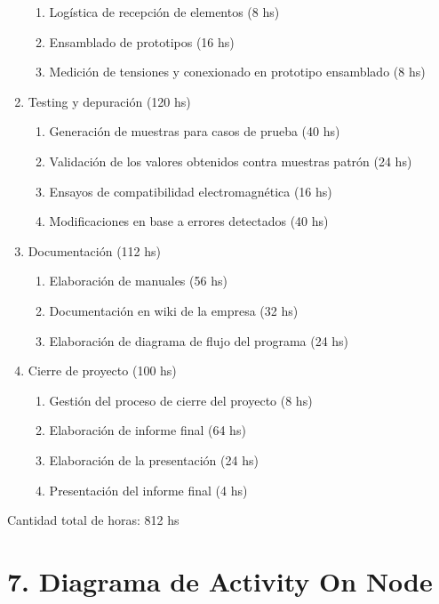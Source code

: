 \documentclass[11pt]{charter}
\begin{document}
\begin{enumerate}
\begin{enumerate}
	\item Logística de recepción de elementos (8 hs)
	\item Ensamblado de prototipos (16 hs)
	\item Medición de tensiones y conexionado en prototipo ensamblado (8 hs)
	\end{enumerate}
\item Testing y depuración (120 hs)
	\begin{enumerate}
	\item Generación de muestras para casos de prueba (40 hs)
	\item Validación de los valores obtenidos contra muestras patrón (24 hs)
	\item Ensayos de compatibilidad electromagnética (16 hs)
	\item Modificaciones en base a errores detectados (40 hs)
	\end{enumerate}
\item Documentación (112 hs)
	\begin{enumerate}
	\item Elaboración de manuales (56 hs)
	\item Documentación en wiki de la empresa (32 hs)
	\item Elaboración de diagrama de flujo del programa (24 hs)
	\end{enumerate}
\item Cierre de proyecto (100 hs)
	\begin{enumerate}
	\item Gestión del proceso de cierre del proyecto (8 hs)
	\item Elaboración de informe final (64 hs)
	\item Elaboración de la presentación (24 hs)
	\item Presentación del informe final (4 hs)
	\end{enumerate}
\end{enumerate}

Cantidad total de horas: 812 hs


\section{7. Diagrama de Activity On Node}
\label{sec:AoN}
\end{document}
